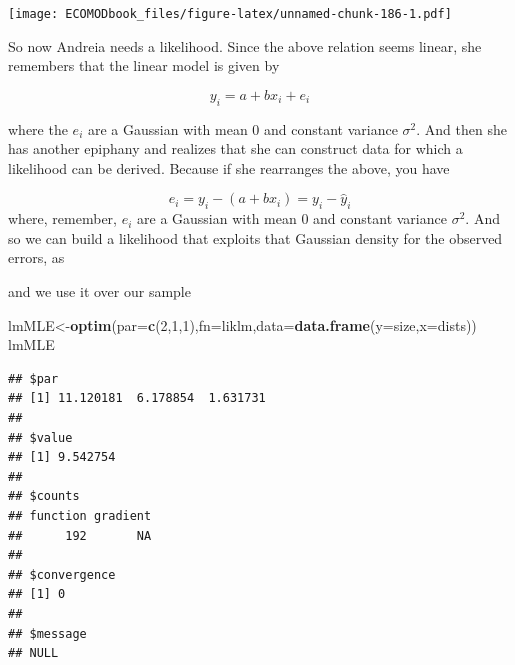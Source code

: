 \documentclass[
]{book}
\newenvironment{Shaded}{\begin{snugshade}}{\end{snugshade}}
\newcommand{\CommentTok}[1]{\textcolor[rgb]{0.56,0.35,0.01}{\textit{#1}}}
\newcommand{\ControlFlowTok}[1]{\textcolor[rgb]{0.13,0.29,0.53}{\textbf{#1}}}
\newcommand{\DataTypeTok}[1]{\textcolor[rgb]{0.13,0.29,0.53}{#1}}
\newcommand{\DecValTok}[1]{\textcolor[rgb]{0.00,0.00,0.81}{#1}}
\newcommand{\KeywordTok}[1]{\textcolor[rgb]{0.13,0.29,0.53}{\textbf{#1}}}
\newcommand{\NormalTok}[1]{#1}
\newcommand{\OperatorTok}[1]{\textcolor[rgb]{0.81,0.36,0.00}{\textbf{#1}}}
\begin{document}
\texttt{[image: ECOMODbook\_files/figure-latex/unnamed-chunk-186-1.pdf]}

So now Andreia needs a likelihood. Since the above relation seems linear, she remembers that the linear model is given by

\[y_i=a+b x_i+e_i\]

where the \(e_i\) are a Gaussian with mean 0 and constant variance \(\sigma^2\). And then she has another epiphany and realizes that she can construct data for which a likelihood can be derived. Because if she rearranges the above, you have

\[e_i=y_i-(a+b x_i)=y_i-\hat y_i\]
where, remember, \(e_i\) are a Gaussian with mean 0 and constant variance \(\sigma^2\). And so we can build a likelihood that exploits that Gaussian density for the observed errors, as

\begin{Shaded}
\end{Shaded}

and we use it over our sample

\begin{Shaded}
\begin{Highlighting}[]
\NormalTok{lmMLE<-}\KeywordTok{optim}\NormalTok{(}\DataTypeTok{par=}\KeywordTok{c}\NormalTok{(}\DecValTok{2}\NormalTok{,}\DecValTok{1}\NormalTok{,}\DecValTok{1}\NormalTok{),}\DataTypeTok{fn=}\NormalTok{liklm,}\DataTypeTok{data=}\KeywordTok{data.frame}\NormalTok{(}\DataTypeTok{y=}\NormalTok{size,}\DataTypeTok{x=}\NormalTok{dists))}
\NormalTok{lmMLE}
\end{Highlighting}
\end{Shaded}

\begin{verbatim}
## $par
## [1] 11.120181  6.178854  1.631731
## 
## $value
## [1] 9.542754
## 
## $counts
## function gradient 
##      192       NA 
## 
## $convergence
## [1] 0
## 
## $message
## NULL
\end{verbatim}
\end{document}
